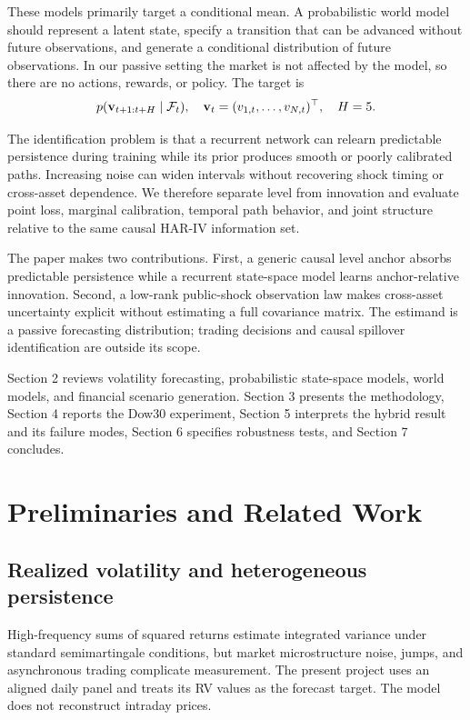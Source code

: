 \documentclass[11pt]{article}
\begin{document}
These models primarily target a conditional mean. A probabilistic world model should represent a latent state, specify a transition that can be advanced without future observations, and generate a conditional distribution of future observations. In our passive setting the market is not affected by the model, so there are no actions, rewards, or policy. The target is
\begin{equation}p(\mathbf v_{t+1:t+H}\mid\mathcal F_t),\quad \mathbf v_t=(v_{1,t},\ldots,v_{N,t})^\top,\quad H=5.\end{equation}

The identification problem is that a recurrent network can relearn predictable persistence during training while its prior produces smooth or poorly calibrated paths. Increasing noise can widen intervals without recovering shock timing or cross-asset dependence. We therefore separate level from innovation and evaluate point loss, marginal calibration, temporal path behavior, and joint structure relative to the same causal HAR-IV information set.

The paper makes two contributions. First, a generic causal level anchor absorbs predictable persistence while a recurrent state-space model learns anchor-relative innovation. Second, a low-rank public-shock observation law makes cross-asset uncertainty explicit without estimating a full covariance matrix. The estimand is a passive forecasting distribution; trading decisions and causal spillover identification are outside its scope.

Section 2 reviews volatility forecasting, probabilistic state-space models, world models, and financial scenario generation. Section 3 presents the methodology, Section 4 reports the Dow30 experiment, Section 5 interprets the hybrid result and its failure modes, Section 6 specifies robustness tests, and Section 7 concludes.

\section{Preliminaries and Related Work}
\subsection{Realized volatility and heterogeneous persistence}
High-frequency sums of squared returns estimate integrated variance under standard semimartingale conditions, but market microstructure noise, jumps, and asynchronous trading complicate measurement. The present project uses an aligned daily panel and treats its RV values as the forecast target. The model does not reconstruct intraday prices.
\end{document}
